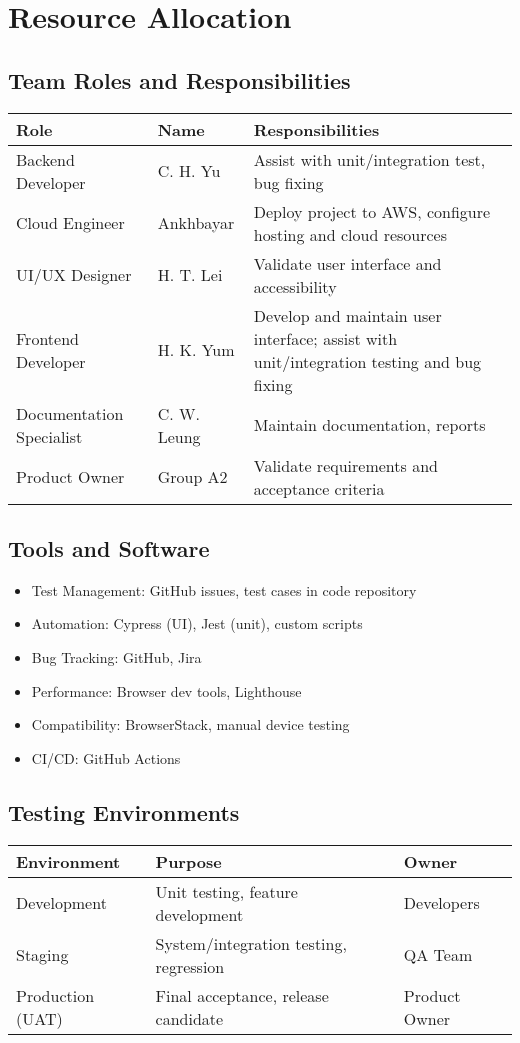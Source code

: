 \documentclass[a4paper,11pt]{scrartcl}
\begin{document}
\section{Resource Allocation}

\subsection{Team Roles and Responsibilities}
\begin{tabularx}{\textwidth}{l l X}
\toprule
Role & Name & Responsibilities \\
\midrule
Backend Developer & C. H. Yu & Assist with unit/integration test, bug fixing \\
Cloud Engineer & Ankhbayar & Deploy project to AWS, configure hosting and cloud resources \\
UI/UX Designer & H. T. Lei & Validate user interface and accessibility \\
Frontend Developer & H. K. Yum & Develop and maintain user interface; assist with unit/integration testing and bug fixing \\
Documentation Specialist & C. W. Leung & Maintain documentation, reports \\
Product Owner & Group A2 & Validate requirements and acceptance criteria \\
\bottomrule
\end{tabularx}

\subsection{Tools and Software}
\begin{itemize}[leftmargin=*]
    \item Test Management: GitHub issues, test cases in code repository
    \item Automation: Cypress (UI), Jest (unit), custom scripts
    \item Bug Tracking: GitHub, Jira
    \item Performance: Browser dev tools, Lighthouse
    \item Compatibility: BrowserStack, manual device testing
    \item CI/CD: GitHub Actions
\end{itemize}

\subsection{Testing Environments}
\begin{tabularx}{\textwidth}{l X l}
\toprule
Environment & Purpose & Owner \\
\midrule
Development & Unit testing, feature development & Developers \\
Staging & System/integration testing, regression & QA Team \\
Production (UAT) & Final acceptance, release candidate & Product Owner \\
\bottomrule
\end{tabularx}
\end{document}
